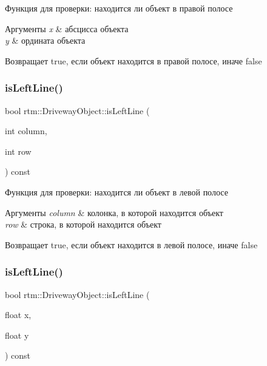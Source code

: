 Функция для проверки\+: находится ли объект в правой полосе 
\begin{DoxyParams}{Аргументы}
{\em x} & абсцисса объекта \\
\hline
{\em y} & ордината объекта \\
\hline
\end{DoxyParams}
\begin{DoxyReturn}{Возвращает}
true, если объект находится в правой полосе, иначе false 
\end{DoxyReturn}
\mbox{\label{classrtm_1_1_driveway_object_aea7d711c9cf1ba995bc08d805373cc52}} 
\subsubsection{\texorpdfstring{is\+Left\+Line()}{isLeftLine()}\hspace{0.1cm}{\footnotesize\ttfamily [1/2]}}
{\footnotesize\ttfamily bool rtm\+::\+Driveway\+Object\+::is\+Left\+Line (\begin{DoxyParamCaption}\item[{int}]{column,  }\item[{int}]{row }\end{DoxyParamCaption}) const}

Функция для проверки\+: находится ли объект в левой полосе 
\begin{DoxyParams}{Аргументы}
{\em column} & колонка, в которой находится объект \\
\hline
{\em row} & строка, в которой находится объект \\
\hline
\end{DoxyParams}
\begin{DoxyReturn}{Возвращает}
true, если объект находится в левой полосе, иначе false 
\end{DoxyReturn}
\mbox{\label{classrtm_1_1_driveway_object_afa48600b7d87a38e6c690e3b1058d177}} 
\subsubsection{\texorpdfstring{is\+Left\+Line()}{isLeftLine()}\hspace{0.1cm}{\footnotesize\ttfamily [2/2]}}
{\footnotesize\ttfamily bool rtm\+::\+Driveway\+Object\+::is\+Left\+Line (\begin{DoxyParamCaption}\item[{float}]{x,  }\item[{float}]{y }\end{DoxyParamCaption}) const}

